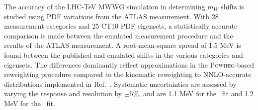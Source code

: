 The accuracy of the LHC-TeV MWWG simulation in determining $m_W$ shifts is studied using PDF variations from the 
ATLAS measurement.  With 28 measurement categories and 25 CT10 PDF eigensets, a statistically accurate comparison 
is made between the emulated measurement procedure and the results of the ATLAS measurement.  
A root-mean-square spread of 1.5 MeV is found between the published and emulated shifts in the various categories and eigensets.
The differences dominantly reflect approximations in the {\textsc{Powheg}}-based reweighting procedure compared to the
kinematic reweighting to NNLO-accurate distributions implemented in Ref.~\cite{Aaboud:2017svj}.
Systematic uncertainties are assessed by varying the response and resolution by $\pm 5\%$, and are 1.1 MeV for the
\pTl~fit and 1.2 MeV for the \mT~fit.
